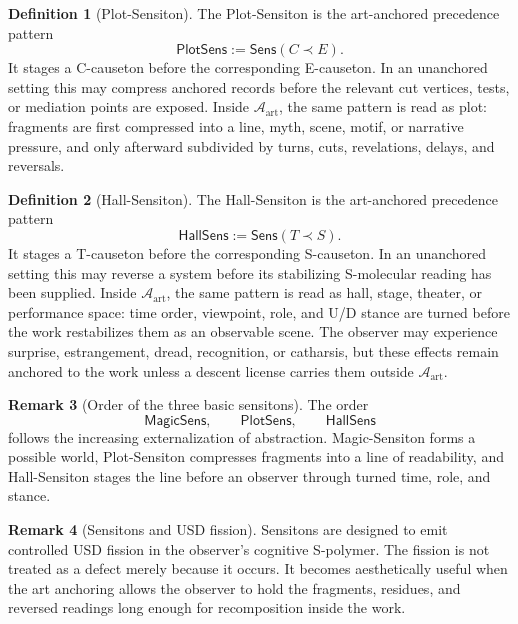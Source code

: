 \documentclass[11pt]{article}
\newcommand{\defeq}{\mathrel{:=}}
\newcommand{\Sens}{\mathsf{Sens}}
\newcommand{\Art}{\mathcal A_{\mathrm{art}}}
\newcommand{\MagicSens}{\mathsf{MagicSens}}
\newcommand{\PlotSens}{\mathsf{PlotSens}}
\newcommand{\HallSens}{\mathsf{HallSens}}
\theoremstyle{definition}
\newtheorem{definition}{Definition}[section]
\newtheorem{remark}[definition]{Remark}
\theoremstyle{plain}
\begin{document}
\begin{definition}[Plot-Sensiton]
The Plot-Sensiton is the art-anchored precedence pattern
\[
  \PlotSens
  \defeq
  \Sens(C\prec E).
\]
It stages a C-causeton before the corresponding E-causeton.  In an
unanchored setting this may compress anchored records before the relevant
cut vertices, tests, or mediation points are exposed.  Inside \(\Art\),
the same pattern is read as plot: fragments are first compressed into a
line, myth, scene, motif, or narrative pressure, and only afterward
subdivided by turns, cuts, revelations, delays, and reversals.
\end{definition}

\begin{definition}[Hall-Sensiton]
The Hall-Sensiton is the art-anchored precedence pattern
\[
  \HallSens
  \defeq
  \Sens(T\prec S).
\]
It stages a T-causeton before the corresponding S-causeton.  In an
unanchored setting this may reverse a system before its stabilizing
S-molecular reading has been supplied.  Inside \(\Art\), the same pattern
is read as hall, stage, theater, or performance space: time order,
viewpoint, role, and U/D stance are turned before the work restabilizes
them as an observable scene.  The observer may experience surprise,
estrangement, dread, recognition, or catharsis, but these effects remain
anchored to the work unless a descent license carries them outside
\(\Art\).
\end{definition}

\begin{remark}[Order of the three basic sensitons]
The order
\[
  \MagicSens,\qquad
  \PlotSens,\qquad
  \HallSens
\]
follows the increasing externalization of abstraction.  Magic-Sensiton
forms a possible world, Plot-Sensiton compresses fragments into a line of
readability, and Hall-Sensiton stages the line before an observer through
turned time, role, and stance.
\end{remark}

\begin{remark}[Sensitons and USD fission]
Sensitons are designed to emit controlled USD fission in the observer's
cognitive S-polymer.  The fission is not treated as a defect merely
because it occurs.  It becomes aesthetically useful when the art anchoring
allows the observer to hold the fragments, residues, and reversed readings
long enough for recomposition inside the work.
\end{remark}

\end{document}
